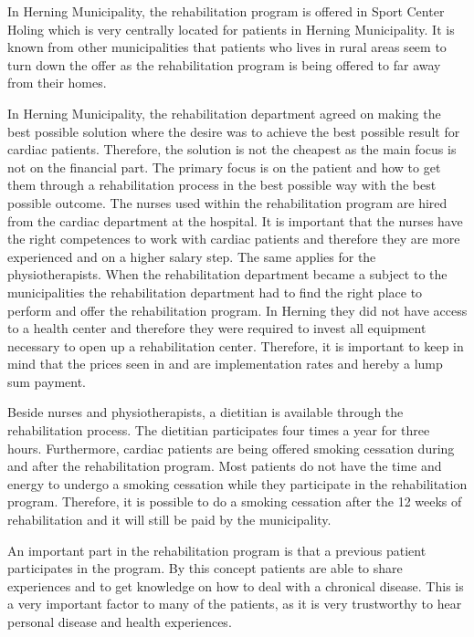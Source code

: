 In Herning Municipality, the rehabilitation program is offered in Sport Center Holing which is very centrally located for patients in Herning Municipality. It is known from other municipalities that patients who lives in rural areas seem to turn down the offer as the rehabilitation program is being offered to far away from their homes. 

In Herning Municipality, the rehabilitation department agreed on making the best possible solution where the desire was to achieve the best possible result for cardiac patients. Therefore, the solution is not the cheapest as the main focus is not on the financial part. The primary focus is on the patient and how to get them through a rehabilitation process in the best possible way with the best possible outcome. The nurses used within the rehabilitation program are hired from the cardiac department at the hospital. It is important that the nurses have the right competences to work with cardiac patients and therefore they are more experienced and on a higher salary step. The same applies for the physiotherapists. When the rehabilitation department became a subject to the municipalities the rehabilitation department had to find the right place to perform and offer the rehabilitation program. In Herning they did not have access to a health center and therefore they were required to invest all equipment necessary to open up a rehabilitation center. Therefore, it is important to keep in mind that the prices seen in  and  are implementation rates and hereby a lump sum payment.   

Beside nurses and physiotherapists, a dietitian is available through the rehabilitation process. The dietitian participates four times a year for three hours. Furthermore, cardiac patients are being offered smoking cessation during and after the rehabilitation program. Most patients do not have the time and energy to undergo a smoking cessation while they participate in the rehabilitation program. Therefore, it is possible to do a smoking cessation after the 12 weeks of rehabilitation and it will still be paid by the municipality.   

An important part in the rehabilitation program is that a previous patient participates in the program. By this concept patients are able to share experiences and to get knowledge on how to deal with a chronical disease. This is a very important factor to many of the patients, as it is very trustworthy to hear personal disease and health experiences. 

